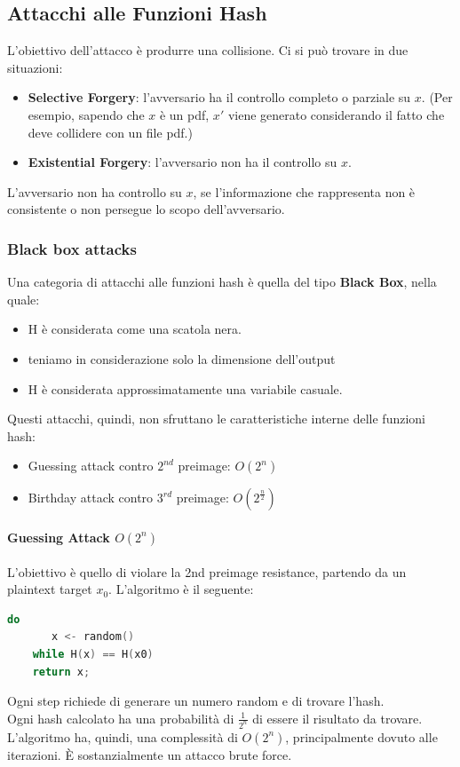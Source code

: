 \documentclass[a4paper,12pt]{article}
\begin{document}
\subsection{Attacchi alle Funzioni Hash}
L'obiettivo dell'attacco è produrre una collisione. Ci si può trovare in due situazioni:
\begin{itemize}
	\item \textbf{Selective Forgery}: l'avversario ha il controllo completo o parziale su $x$. (Per esempio, sapendo che $x$ è un pdf, $x'$ viene generato considerando il fatto che deve collidere con un file pdf.)
	\item \textbf{Existential Forgery}: l'avversario non ha il controllo su $x$.
\end{itemize}
L'avversario non ha controllo su $x$, se l'informazione che rappresenta non è consistente o non persegue lo scopo dell'avversario. \\
\subsubsection{Black box attacks}
Una categoria di attacchi alle funzioni hash è quella del tipo \textbf{Black Box}, nella quale:
\begin{itemize}
	\item H è considerata come una scatola nera.
	\item teniamo in considerazione solo la dimensione dell'output
	\item H è considerata approssimatamente una variabile casuale.
\end{itemize}
Questi attacchi, quindi, non sfruttano le caratteristiche interne delle funzioni hash:
\begin{itemize}
	\item Guessing attack contro $2^{nd}$ preimage: $O(2^n)$
	\item Birthday attack contro $3^{rd}$ preimage: $O(2^{\frac{n}{2}})$
\end{itemize}

\paragraph{Guessing Attack $O(2^n)$} 
L'obiettivo è quello di violare la 2nd preimage resistance, partendo da un plaintext target $x_0$.
L'algoritmo è il seguente:
\begin{center}
\begin{lstlisting}[language=C]
	do 
	   x <- random()
	while H(x) == H(x0)
	return x;
\end{lstlisting}
\end{center}
Ogni step richiede di generare un numero random e di trovare l'hash. \\
Ogni hash calcolato ha una probabilità di $\frac{1}{2^n}$ di essere il risultato da trovare. 
L'algoritmo ha, quindi, una complessità di $O(2^n)$, principalmente dovuto alle iterazioni. È sostanzialmente un attacco brute force.
\end{document}
